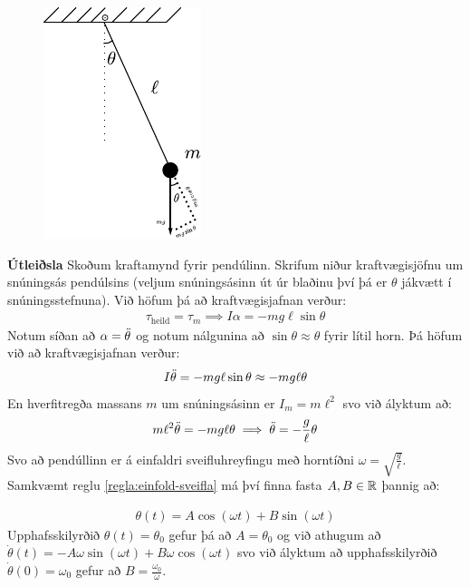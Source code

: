 \ifdefined \wholebook \else\documentclass[oneside]{book}\usepackage{EdlBook}\graphicspath{{figures/}}
\begin{document}
\begin{minipage}{\linewidth}

\begin{figure}
\includegraphics[scale = 1.25]{figures/pendulum-2.pdf}
\end{figure}

\textbf{Útleiðsla} Skoðum kraftamynd fyrir pendúlinn. Skrifum niður kraftvægisjöfnu um snúningsás pendúlsins (veljum snúningsásinn út úr blaðinu því þá er $\theta$ jákvætt í snúningsstefnuna). Við höfum þá að kraftvægisjafnan verður:
\begin{align*}
    \tau_{\text{heild}} = \tau_{m} \implies I\alpha = -mg\ell \sin\theta
\end{align*}
Notum síðan að $\alpha = \Ddot{\theta}$ og notum nálgunina að $\sin\theta \approx \theta$ fyrir lítil horn. Þá höfum við að kraftvægisjafnan verður:
\begin{align*}
    I\Ddot{\theta} = -mg\ell \sin\theta \approx -mg\ell \theta
\end{align*}
En hverfitregða massans $m$ um snúningsásinn er $I_m = m\ell^2$ svo við ályktum að:
\begin{align*}
    m\ell^2 \Ddot{\theta} = -mg\ell\theta \implies \Ddot{\theta} = -\frac{g}{\ell}\theta
\end{align*}
Svo að pendúllinn er á einfaldri sveifluhreyfingu með horntíðni $\omega = \sqrt{\frac{g}{\ell}}$. Samkvæmt reglu \ref{regla:einfold-sveifla} má því finna fasta $A, B \in \mathbb{R}$ þannig að:
\end{minipage}
\begin{align*}
    \theta(t) = A\cos(\omega t) + B\sin(\omega t)
\end{align*}
Upphafsskilyrðið $\theta(t) = \theta_0$ gefur þá að $A = \theta_0$ og við athugum að $\dot{\theta}(t) = -A\omega \sin(\omega t) + B\omega \cos(\omega t)$ svo við ályktum að upphafsskilyrðið $\dot{\theta}(0) = \omega_0$ gefur að $B = \frac{\omega_0}{\omega}$.
\end{document}
